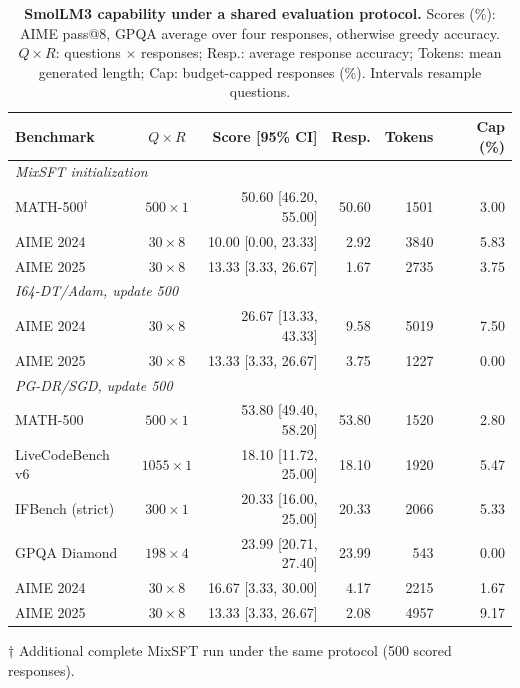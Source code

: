 \begin{table}[!htbp]
\centering\small
\setlength{\tabcolsep}{3pt}
\caption{\textbf{SmolLM3 capability under a shared evaluation protocol.} Scores (\%): AIME pass@8, GPQA average over four responses, otherwise greedy accuracy. $Q\!\times\!R$: questions $\times$ responses; Resp.: average response accuracy; Tokens: mean generated length; Cap: budget-capped responses (\%). Intervals resample questions.}
\label{tab:smollm_capability}
\begin{tabular}{lcrrrr}
\toprule
Benchmark & $Q\!\times\!R$ & Score [95\% CI] & Resp. & Tokens & Cap (\%) \\
\midrule
\multicolumn{6}{l}{\textit{MixSFT initialization}} \\
MATH-500$^{\dagger}$ & $500\times1$ & 50.60 [46.20, 55.00] & 50.60 & 1501 & 3.00 \\
AIME 2024 & $30\times8$ & 10.00 [0.00, 23.33] & 2.92 & 3840 & 5.83 \\
AIME 2025 & $30\times8$ & 13.33 [3.33, 26.67] & 1.67 & 2735 & 3.75 \\
\midrule
\multicolumn{6}{l}{\textit{I64-DT/Adam, update 500}} \\
AIME 2024 & $30\times8$ & 26.67 [13.33, 43.33] & 9.58 & 5019 & 7.50 \\
AIME 2025 & $30\times8$ & 13.33 [3.33, 26.67] & 3.75 & 1227 & 0.00 \\
\midrule
\multicolumn{6}{l}{\textit{PG-DR/SGD, update 500}} \\
MATH-500 & $500\times1$ & 53.80 [49.40, 58.20] & 53.80 & 1520 & 2.80 \\
LiveCodeBench v6 & $1055\times1$ & 18.10 [11.72, 25.00] & 18.10 & 1920 & 5.47 \\
IFBench (strict) & $300\times1$ & 20.33 [16.00, 25.00] & 20.33 & 2066 & 5.33 \\
GPQA Diamond & $198\times4$ & 23.99 [20.71, 27.40] & 23.99 & 543 & 0.00 \\
AIME 2024 & $30\times8$ & 16.67 [3.33, 30.00] & 4.17 & 2215 & 1.67 \\
AIME 2025 & $30\times8$ & 13.33 [3.33, 26.67] & 2.08 & 4957 & 9.17 \\
\bottomrule
\end{tabular}
\par\vspace{2pt}
{\footnotesize $\dagger$ Additional complete MixSFT run under the same protocol (500 scored responses).}
\end{table}
